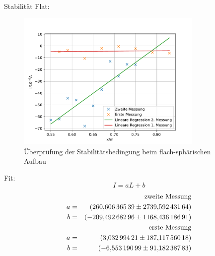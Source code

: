 Stabilität Flat:
\begin{figure}
  \centering
  \includegraphics[width=0.8\textwidth]{stabflat.pdf}
  \caption{Überprüfung der Stabilitätsbedingung beim flach-sphärischen Aufbau}
  \label{fig:stabflat}
\end{figure}
Fit:
\begin{equation*}
  I= aL+b
\end{equation*}
\FloatBarrier
\begin{align*}
&&\text{zweite Messung} \\
a &=& \SI{260.60636539 \pm 2739.59243164}{} \\
b &=& \SI{-209.49268296 \pm 1168.43618691}{} \\
&&\text{erste Messung} \\
a &=& \SI{3.03299421 \pm 187.11756018}{} \\
b &=& \SI{-6.55319099 \pm 91.18238783}{} \\
\end{align*}
\FloatBarrier

